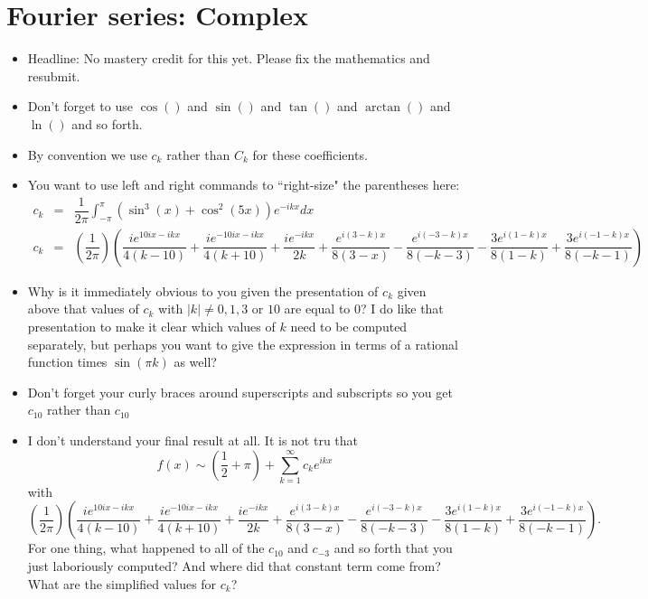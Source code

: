 \documentclass{article}
\newcommand{\bea}{\begin{eqnarray*}}
\newcommand{\eea}{\end{eqnarray*}}
\begin{document}
\section{Fourier series: Complex}
\begin{itemize}
\item Headline: No mastery credit for this yet. Please fix the mathematics and resubmit.
\item Don't forget to use $\cos()$ and $\sin()$ and $\tan()$ and $\arctan()$ and $\ln()$ and so forth.
\item By convention we use $c_k$ rather than $C_k$ for these coefficients.
\item You want to use left and right commands to ``right-size" the parentheses here:
\bea
c_k &=& \dfrac{1}{2\pi}\int_{-\pi}^{\pi} \left(\sin^3(x)+\cos^2(5x)\right)e^{-ikx}dx\\
c_k &=& \left(\dfrac{1}{2\pi}\right)\left(\dfrac{ie^{10ix-ikx}}{4(k-10)} + \dfrac{ie^{-10ix-ikx}}{4(k+10)} + \dfrac{ie^{-ikx}}{2k} + \dfrac{e^{i(3-k)x}}{8(3-x)} - \dfrac{e^{i(-3-k)x}}{8(-k-3)} - \dfrac{3e^{i(1-k)x}}{8(1-k)} + \dfrac{3e^{i(-1-k)x}}{8(-k-1)}\right)
\eea
\item Why is it immediately obvious to you given the presentation of $c_k$ given above that values of $c_k$ with $|k|\neq 0, 1, 3$ or $10$ are equal to 0? I do like that presentation to make it clear which values of $k$ need to be computed separately, but perhaps you want to give the expression in terms of a rational function times $\sin(\pi k)$ as well?  
\item Don't forget your curly braces around superscripts and subscripts so you get $c_{10}$ rather than $c_10$
\item I don't understand your final result at all. It is not tru that \[f(x) \sim (\dfrac{1}{2}+\pi) + \sum_{k=1}^{\infty} c_ke^{ikx} \] with \[ \left(\dfrac{1}{2\pi}\right)\left(\dfrac{ie^{10ix-ikx}}{4(k-10)} + \dfrac{ie^{-10ix-ikx}}{4(k+10)} + \dfrac{ie^{-ikx}}{2k} + \dfrac{e^{i(3-k)x}}{8(3-x)} - \dfrac{e^{i(-3-k)x}}{8(-k-3)} - \dfrac{3e^{i(1-k)x}}{8(1-k)} + \dfrac{3e^{i(-1-k)x}}{8(-k-1)}\right).\] For one thing, what happened to all of the $c_{10}$ and $c_{-3}$ and so forth that you just laboriously computed? And where did that constant term come from? What are the simplified values for $c_k$?
\end{itemize}
\end{document}

